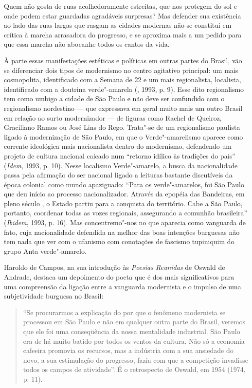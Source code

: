 Quem não gosta de ruas acolhedoramente estreitas, que nos protegem do
sol e onde podem estar guardadas agradáveis surpresas? Mas defender sua
existência ao lado das ruas largas que rasgam as cidades modernas não se
constitui em crítica à marcha arrasadora do progresso, e se aproxima
mais a um pedido para que essa marcha não abocanhe todos os cantos da
vida.

À parte essas manifestações estéticas e políticas em outras partes do
Brasil, vão se diferenciar dois tipos de modernismo no centro agitativo
principal: um mais cosmopolita, identificado com a Semana de 22 e um
mais regionalista, localista, identificado com a doutrina verde"-amarela
(, 1993, p. 9). Esse dito regionalismo tem como umbigo a cidade
de São Paulo e não deve ser confundido com o regionalismo nordestino ---
que expressava em geral muito mais um outro Brasil em relação ao surto
modernizador --- de figuras como Rachel de Queiroz, Graciliano Ramos ou
José Lins do Rego. Trata"-se de um regionalismo paulista ligado à
modernização de São Paulo, em que o Verde"-amarelismo aparece como
corrente ideológica mais nacionalista dentro do modernismo, defendendo
um projeto de cultura nacional calcado num ``retorno idílico às
tradições do país'' (\emph{Idem}, 1993, p. 10). Nesse localismo
Verde"-amarelo, a busca da nacionalidade passa pela afirmação do ser
nacional ligado a leituras bastante discutíveis da época colonial como
mundo apaziguado: ``Para os verde"-amarelos, foi São Paulo que deu início
ao processo nacionalizador. Através da epopéia das Bandeiras, em pleno
século , o Estado partiu para a conquista do território. Cabe a São
Paulo, portanto, coordenar todas as vozes regionais, assegurando a
comunhão brasileira'' (\emph{Ibidem}, 1993, p. 16). Mas concentremo"-nos
no que aparecia como vanguarda de fato, cuja nacionalidade defendida na
melhor das boas intenções burguesas não tem nada que ver com o ufanismo
com conotações de fascismo tupiniquim do grupo Anta verde"-amarelo.

Haroldo de Campos, na sua introdução às \emph{Poesias Reunidas} de
Oswald de Andrade, destaca um depoimento do poeta que é dos mais
significativos para uma compreensão da ligação entre a vanguarda
modernista e o impulso de uma subjetividade burguesa no Brasil:

\begin{quote}
``Se procurarmos a explicação do por que o fenômeno modernista se
processou em São Paulo e não em qualquer outra parte do Brasil, veremos
que ele foi uma conseqüência da nossa mentalidade industrial. São Paulo
era de há muito batido por todos os ventos da cultura. Não só a economia
cafeeira promovia os recursos, mas a indústria com a sua ansiedade do
novo, a sua estimulação do progresso, fazia com que a competição
invadisse todos os campos de atividade''. É o retrospecto de Oswald, em 1954 (1974, p. 11).
\end{quote}

